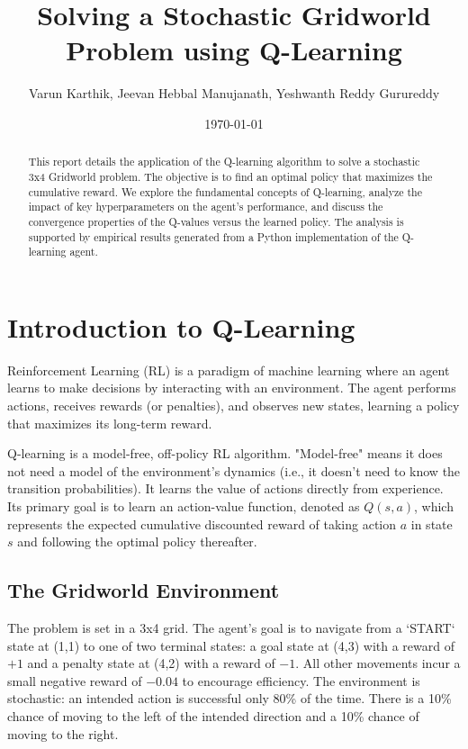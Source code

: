 \documentclass{article}
\title{Solving a Stochastic Gridworld Problem using Q-Learning}
\author{Varun Karthik, Jeevan Hebbal Manujanath, Yeshwanth Reddy Gurureddy}
\date{\today}
\begin{document}
\maketitle
\tableofcontents %
\newpage

\begin{abstract}
This report details the application of the Q-learning algorithm to solve a stochastic 3x4 Gridworld problem. The objective is to find an optimal policy that maximizes the cumulative reward. We explore the fundamental concepts of Q-learning, analyze the impact of key hyperparameters on the agent's performance, and discuss the convergence properties of the Q-values versus the learned policy. The analysis is supported by empirical results generated from a Python implementation of the Q-learning agent.
\end{abstract}

\section{Introduction to Q-Learning}

Reinforcement Learning (RL) is a paradigm of machine learning where an agent learns to make decisions by interacting with an environment. The agent performs actions, receives rewards (or penalties), and observes new states, learning a policy that maximizes its long-term reward.

Q-learning is a model-free, off-policy RL algorithm. "Model-free" means it does not need a model of the environment's dynamics (i.e., it doesn't need to know the transition probabilities). It learns the value of actions directly from experience. Its primary goal is to learn an action-value function, denoted as $Q(s, a)$, which represents the expected cumulative discounted reward of taking action $a$ in state $s$ and following the optimal policy thereafter.

\subsection{The Gridworld Environment}
The problem is set in a 3x4 grid. The agent's goal is to navigate from a `START` state at (1,1) to one of two terminal states: a goal state at (4,3) with a reward of $+1$ and a penalty state at (4,2) with a reward of $-1$. All other movements incur a small negative reward of $-0.04$ to encourage efficiency. The environment is stochastic: an intended action is successful only 80\% of the time. There is a 10\% chance of moving to the left of the intended direction and a 10\% chance of moving to the right.
\end{document}
